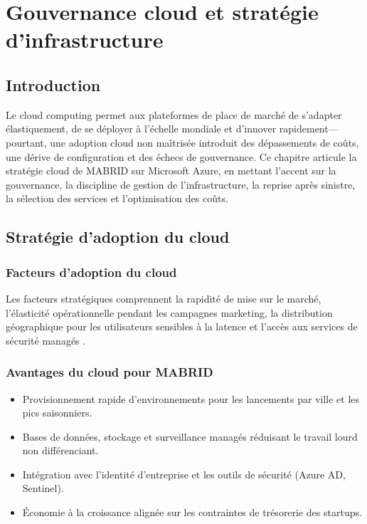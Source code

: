 \chapter{Gouvernance cloud et stratégie d'infrastructure}
\label{ch:cloud}

\section{Introduction}

Le cloud computing permet aux plateformes de place de marché de s'adapter élastiquement, de se déployer à l'échelle mondiale et d'innover rapidement---pourtant, une adoption cloud non maîtrisée introduit des dépassements de coûts, une dérive de configuration et des échecs de gouvernance. Ce chapitre articule la stratégie cloud de MABRID sur Microsoft Azure, en mettant l'accent sur la gouvernance, la discipline de gestion de l'infrastructure, la reprise après sinistre, la sélection des services et l'optimisation des coûts.

\section{Stratégie d'adoption du cloud}

\subsection{Facteurs d'adoption du cloud}

Les facteurs stratégiques comprennent la rapidité de mise sur le marché, l'élasticité opérationnelle pendant les campagnes marketing, la distribution géographique pour les utilisateurs sensibles à la latence et l'accès aux services de sécurité managés \parencite{mell2009cloud,nist800145}.

\subsection{Avantages du cloud pour MABRID}

\begin{itemize}
  \item Provisionnement rapide d'environnements pour les lancements par ville et les pics saisonniers.
  \item Bases de données, stockage et surveillance managés réduisant le travail lourd non différenciant.
  \item Intégration avec l'identité d'entreprise et les outils de sécurité (Azure AD, Sentinel).
  \item Économie à la croissance alignée sur les contraintes de trésorerie des startups.
\end{itemize}


